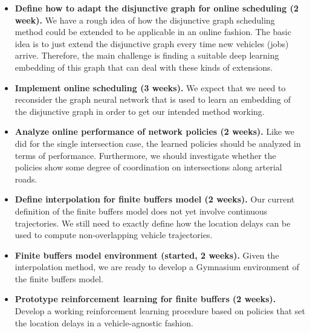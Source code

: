 \documentclass{article}
\begin{document}
\begin{itemize}
  \item \textbf{Define how to adapt the disjunctive graph for online scheduling (2
        week).} We have a rough idea of how the disjunctive graph scheduling
        method could be extended to be applicable in an online fashion. The
        basic idea is to just extend the disjunctive graph every time new
        vehicles (jobs) arrive. Therefore, the main challenge is finding a
        suitable deep learning embedding of this graph that can deal with these
        kinds of extensions.

  \item \textbf{Implement online scheduling (3 weeks).} We expect that we need
        to reconsider the graph neural network that is used to learn an
        embedding of the disjunctive graph in order to get our intended method
        working.

  \item \textbf{Analyze online performance of network policies (2 weeks).} Like
        we did for the single intersection case, the learned policies should be
        analyzed in terms of performance. Furthermore, we should investigate
        whether the policies show some degree of coordination on intersections
        along arterial roads.

  \item \textbf{Define interpolation for finite buffers model (2 weeks).} Our
        current definition of the finite buffers model does not yet involve
        continuous trajectories. We still need to exactly define how the
        location delays can be used to compute non-overlapping vehicle
        trajectories.

  \item \textbf{Finite buffers model environment (started, 2 weeks).} Given the
        interpolation method, we are ready to develop a Gymnasium
        \cite{towers_gymnasium_2023} environment of the finite buffers model.

  \item \textbf{Prototype reinforcement learning for finite buffers (2 weeks).}
        Develop a working reinforcement learning procedure based on policies
        that set the location delays in a vehicle-agnostic fashion.


\end{itemize}





\end{document}
